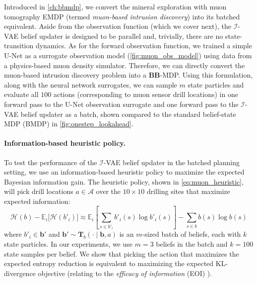 Introduced in \cref{ch:bbmdp}, we convert the mineral exploration with muon tomography EMDP (termed \textit{muon-based intrusion discovery}) into its batched equivalent.
Aside from the observation function (which we cover next), the $\mathcal{I}$-VAE belief updater is designed to be parallel and, trivially, there are no state-transition dynamics.
As for the forward observation function, we trained a simple U-Net \cite{ronneberger2015unet} as a surrogate observation model (\cref{fig:muon_obs_model}) using data from a physics-based muon density simulator.
Therefore, we can directly convert the muon-based intrusion discovery problem into a \textbf{BB}-MDP.
Using this formulation, along with the neural network surrogates, we can sample $m$ state particles and evaluate all $100$ actions (corresponding to muon sensor drill locations) in one forward pass to the U-Net observation surrogate and one forward pass to the $\mathcal{I}$-VAE belief updater as a batch, shown compared to the standard belief-state MDP (BMDP) in \cref{fig:onestep_lookahead}.


\paragraph{Information-based heuristic policy.}
To test the performance of the $\mathcal{I}$-VAE belief updater in the batched planning setting, we use an information-based heuristic policy to maximize the expected Bayesian information gain.
The heuristic policy, shown in \cref{eq:muon_heuristic}, will pick drill locations $a \in \mathcal{A}$ over the $10 \times 10$ drilling sites that maximize expected information:
\begin{equation}
    \mathcal{H}(b) - \mathbb{E}_i\big[\mathcal{H}(b'_i)\big] \approx \mathbb{E}_i\left[ \sum_{s \in b'_i} b'_i(s)\log b'_i(s) \right] - \sum_{s \in b} b(s)\log b(s) \label{eq:expected_entropy_reduction}
\end{equation}
where $b'_i \in \mathbf{b}'$ and $\mathbf{b}' \sim \mathbf{T}_b(\cdot \mid \mathbf{b}, a)$ is an $m$-sized batch of beliefs, each with $k$ state particles.
In our experiments, we use $m = 3$ beliefs in the batch and $k=100$ state samples per belief.
We show that picking the action that maximizes the expected entropy reduction is equivalent to maximizing the expected KL-divergence objective (relating to the \textit{efficacy of information} (EOI) \cite{caers2022efficacy}).


